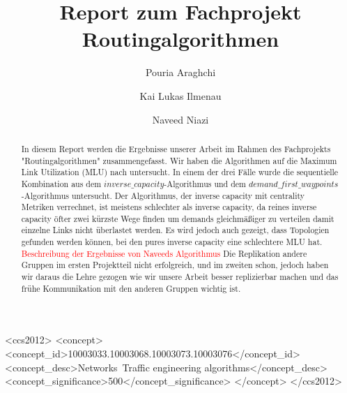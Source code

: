 \documentclass[sigconf, nonacm, review]{acmart}
\begin{document}
\title{Report zum Fachprojekt Routingalgorithmen}
\author{Pouria Araghchi}

\author{Kai Lukas Ilmenau}

\author{Naveed Niazi}

\renewcommand{\shortauthors}{Araghchi, Ilmenau, Niazi}

\begin{abstract}
In diesem Report werden die Ergebnisse unserer Arbeit im Rahmen des Fachprojekts "Routingalgorithmen" zusammengefasst.
Wir haben die Algorithmen auf die Maximum Link Utilization (MLU) nach \cite{foerster2021} untersucht.
In einem der drei F\"alle wurde die sequentielle Kombination aus dem $inverse\_capacity$-Algorithmus und dem $demand\_first\_waypoints$-Algorithmus untersucht.
Der Algorithmus, der inverse capacity mit centrality Metriken verrechnet, ist meistens schlechter als inverse capacity, 
da reines inverse capacity \"ofter zwei k\"urzste Wege finden um demands gleichm\"a\ss iger zu verteilen damit einzelne Links nicht \"uberlastet werden.
Es wird jedoch auch gezeigt, dass Topologien gefunden werden k\"onnen, bei den pures inverse capacity eine schlechtere MLU hat.
\textcolor{red}{Beschreibung der Ergebnisse von Naveeds Algorithmus}
Die Replikation andere Gruppen im ersten Projektteil nicht erfolgreich, und im zweiten schon, 
jedoch haben wir daraus die Lehre gezogen wie wir unsere Arbeit besser replizierbar machen und das fr\"uhe Kommunikation mit den anderen Gruppen wichtig ist.
\end{abstract}

\begin{CCSXML}
<ccs2012>
<concept>
<concept_id>10003033.10003068.10003073.10003076</concept_id>
<concept_desc>Networks~Traffic engineering algorithms</concept_desc>
<concept_significance>500</concept_significance>
</concept>
</ccs2012>
\end{CCSXML}
\end{document}
